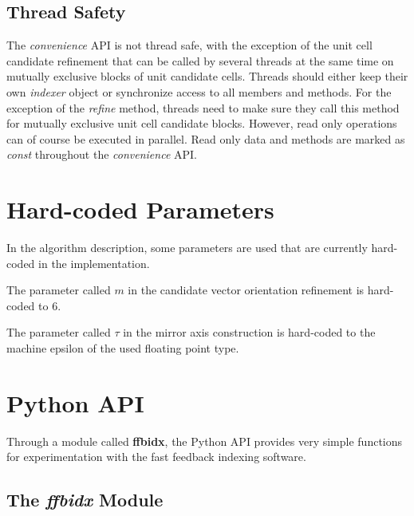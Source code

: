 \documentclass[a4paper,10pt]{article}
\begin{document}
\subsection{Thread Safety}

The \emph{convenience} API is not thread safe, with the exception of the unit cell candidate refinement that can be called by several threads at the same time on mutually exclusive blocks of unit candidate cells. Threads should either keep their own \emph{indexer} object or synchronize access to all members and methods. For the exception of the \emph{refine} method, threads need to make sure they call this method for mutually exclusive unit cell candidate blocks. However, read only operations can of course be executed in parallel. Read only data and methods are marked as \emph{const} throughout the \emph{convenience} API.

\section{Hard-coded Parameters}

In the algorithm description, some parameters are used that are currently hard-coded in the implementation.

The parameter called $m$ in the candidate vector orientation refinement is hard-coded to 6.

The parameter called $\tau$ in the mirror axis construction is hard-coded to the machine epsilon of the used floating point type.

\section{Python API}
\lstset{language=Python}

Through a module called \textbf{ffbidx}, the Python API provides very simple functions for experimentation with the fast feedback indexing software.

\subsection{The \emph{ffbidx} Module}
\end{document}
